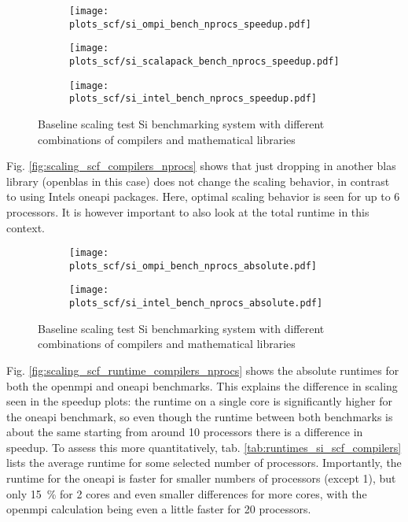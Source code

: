 \documentclass[main.tex]{subfiles}
\begin{document}
\begin{figure}[ht!]
\begin{subfigure}[b]{0.49\textwidth}
    \centering
    \texttt{[image: plots\_scf/si\_ompi\_bench\_nprocs\_speedup.pdf]}
\end{subfigure}
\begin{subfigure}[b]{0.49\textwidth}
    \centering
    \texttt{[image: plots\_scf/si\_scalapack\_bench\_nprocs\_speedup.pdf]}
\end{subfigure}
\begin{subfigure}[b]{0.49\textwidth}
    \centering
    \texttt{[image: plots\_scf/si\_intel\_bench\_nprocs\_speedup.pdf]}
\end{subfigure}
\caption{Baseline scaling test Si benchmarking system with different combinations of compilers and mathematical libraries}
\label{fig:scaling_scf_compilers_si}
\end{figure}

Fig. \ref{fig:scaling_scf_compilers_nprocs} shows that just dropping in another \gls{blas} library (\gls{openblas} in this case) does not change the scaling behavior, in contrast to using Intels \gls{oneapi} packages.
Here, optimal scaling behavior is seen for up to 6 processors.
It is however important to also look at the total runtime in this context.

\begin{figure}[ht!]
\begin{subfigure}[b]{0.49\textwidth}
    \centering
    \texttt{[image: plots\_scf/si\_ompi\_bench\_nprocs\_absolute.pdf]}
\end{subfigure}
\begin{subfigure}[b]{0.49\textwidth}
    \centering
    \texttt{[image: plots\_scf/si\_intel\_bench\_nprocs\_absolute.pdf]}
\end{subfigure}
\caption{Baseline scaling test Si benchmarking system with different combinations of compilers and mathematical libraries}
\label{fig:scaling_scf_compilers_runtime_si}
\end{figure}
Fig. \ref{fig:scaling_scf_runtime_compilers_nprocs} shows the absolute runtimes for both the \gls{openmpi} and \gls{oneapi} benchmarks.
This explains the difference in scaling seen in the speedup plots: the runtime on a single core is significantly higher for the \gls{oneapi} benchmark, so even though the runtime between both benchmarks is about the same starting from around 10 processors there is a difference in speedup.
To assess this more quantitatively, tab. \ref{tab:runtimes_si_scf_compilers} lists the average runtime for some selected number of processors.
Importantly, the runtime for the \gls{oneapi} is faster for smaller numbers of processors (except 1), but only \SI{15}{\percent} for 2 cores and even smaller differences for more cores, with the \gls{openmpi} calculation being even a little faster for 20 processors.
\end{document}
